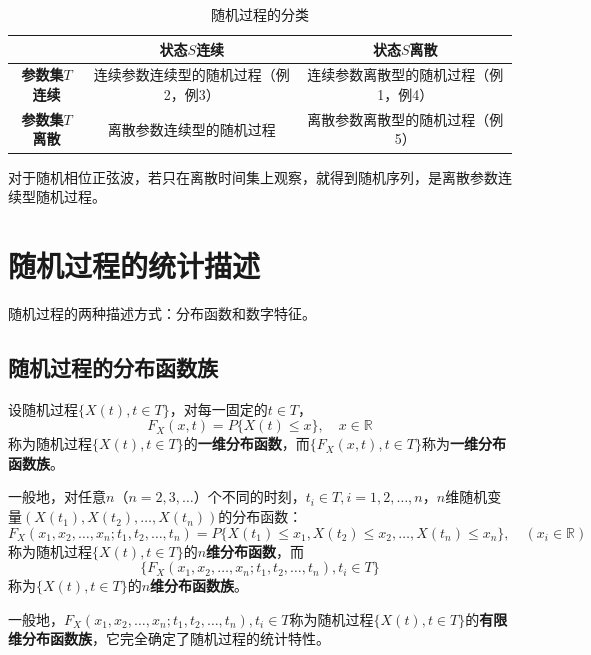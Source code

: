 \documentclass[11pt,a4paper]{report}
\theoremstyle{definition}
\begin{document}
\begin{table}[htbp]
\centering
\caption{随机过程的分类}
\begin{tabular}{@{}ccc@{}}
\toprule
& \textbf{状态$S$连续} & \textbf{状态$S$离散} \\
\midrule
\textbf{参数集$T$连续} & 连续参数连续型的随机过程（例2，例3） & 连续参数离散型的随机过程（例1，例4） \\
\textbf{参数集$T$离散} & 离散参数连续型的随机过程 & 离散参数离散型的随机过程（例5） \\
\bottomrule
\end{tabular}
\end{table}

对于随机相位正弦波，若只在离散时间集上观察，就得到随机序列，是离散参数连续型随机过程。

\section{随机过程的统计描述}

随机过程的两种描述方式：分布函数和数字特征。

\subsection{随机过程的分布函数族}

设随机过程$\{X(t),t\in T\}$，对每一固定的$t\in T$，
\[
F_X(x,t)=P\{X(t)\leq x\},\quad x\in\mathbb{R}
\]
称为随机过程$\{X(t),t\in T\}$的\textbf{一维分布函数}，而$\{F_X(x,t),t\in T\}$称为\textbf{一维分布函数族}。

一般地，对任意$n$（$n=2,3,\ldots$）个不同的时刻，$t_i\in T,i=1,2,\ldots,n$，$n$维随机变量$(X(t_1),X(t_2),\ldots,X(t_n))$的分布函数：
\[
F_X(x_1,x_2,\ldots,x_n;t_1,t_2,\ldots,t_n)=P\{X(t_1)\leq x_1,X(t_2)\leq x_2,\ldots,X(t_n)\leq x_n\},\quad (x_i\in\mathbb{R})
\]
称为随机过程$\{X(t),t\in T\}$的\textbf{$n$维分布函数}，而
\[
\{F_X(x_1,x_2,\ldots,x_n;t_1,t_2,\ldots,t_n),t_i\in T\}
\]
称为$\{X(t),t\in T\}$的\textbf{$n$维分布函数族}。

一般地，$F_X(x_1,x_2,\ldots,x_n;t_1,t_2,\ldots,t_n),t_i\in T$称为随机过程$\{X(t),t\in T\}$的\textbf{有限维分布函数族}，它完全确定了随机过程的统计特性。
\end{document}
